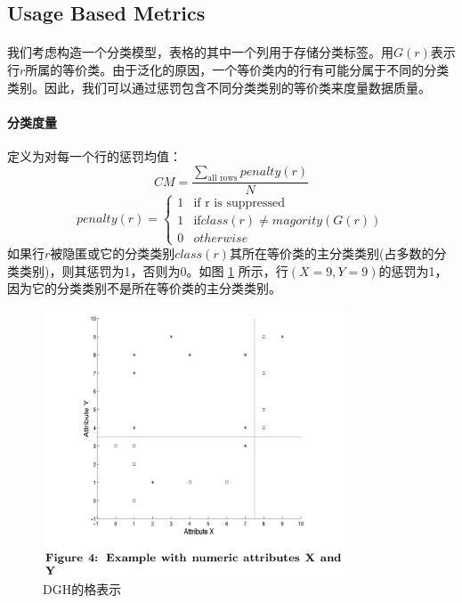 \documentclass[12pt,a4paper]{article}
\begin{document}
\subsection{Usage Based Metrics}
\paragraph{} 我们考虑构造一个分类模型，表格的其中一个列用于存储分类标签。用$G(r)$表示行$r$所属的等价类。由于泛化的原因，一个等价类内的行有可能分属于不同的分类类别。因此，我们可以通过惩罚包含不同分类类别的等价类来度量数据质量。
\paragraph{分类度量} 定义为对每一个行的惩罚均值：
\begin{equation}
	CM = \frac{\sum_{\mbox{all rows}}penalty(r)}{N}
\end{equation}
\begin{equation}
	penalty(r) = 
		\left\{\begin{matrix}
				1 & \mbox{if r is suppressed} \\ 
				1 & \mbox{if} class(r) \neq magority(G(r)) \\ 
				0 & otherwise
		\end{matrix}\right.
\end{equation}
如果行$r$被隐匿或它的分类类别$class(r)$其所在等价类的主分类类别(占多数的分类类别)，则其惩罚为1，否则为0。如图 \ref{cm-example} 所示，行$(X=9,Y=9)$的惩罚为1，因为它的分类类别不是所在等价类的主分类类别。
\begin{figure}[H]
	\centering
	\includegraphics[width=0.8\textwidth]{../images/cm-example.png}
	\caption{DGH的格表示}
	\label{cm-example}
\end{figure}
\end{document}
